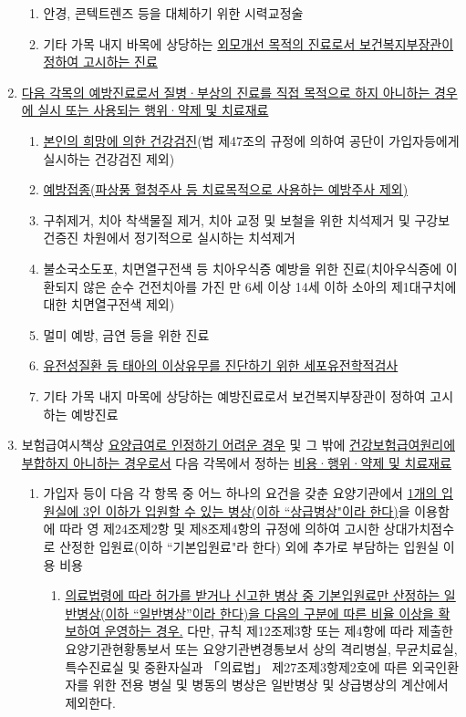 \begin{enumerate}[1.]
\begin{enumerate}[가.]
	\item 안경, 콘텍트렌즈 등을 대체하기 위한 시력교정술
	\item 기타 가목 내지 바목에 상당하는 \uline{외모개선 목적의 진료로서 보건복지부장관이 정하여 고시하는 진료}
	\end{enumerate}
\item \uline{다음 각목의 예방진료로서 질병·부상의 진료를 직접 목적으로 하지 아니하는 경우에 실시 또는 사용되는 행위·약제 및 치료재료}
	\begin{enumerate}[가.]\tightlist
	\item \uline{본인의 희망에 의한 건강검진}(법 제47조의 규정에 의하여 공단이 가입자등에게 실시하는 건강검진 제외)
	\item \uline{예방접종(파상풍 혈청주사 등 치료목적으로 사용하는 예방주사 제외)}
	\item 구취제거, 치아 착색물질 제거, 치아 교정 및 보철을 위한 치석제거 및 구강보건증진 차원에서 정기적으로 실시하는 치석제거
	\item 불소국소도포, 치면열구전색 등 치아우식증 예방을 위한 진료(치아우식증에 이환되지 않은 순수 건전치아를 가진 만 6세 이상 14세 이하 소아의 제1대구치에 대한 치면열구전색 제외)
	\item 멀미 예방, 금연 등을 위한 진료
	\item \uline{유전성질환 등 태아의 이상유무를 진단하기 위한 세포유전학적검사}
	\item 기타 가목 내지 마목에 상당하는 예방진료로서 보건복지부장관이 정하여 고시하는 예방진료
	\end{enumerate}
\item 보험급여시책상 \uline{요양급여로 인정하기 어려운 경우} 및 그 밖에 \uline{건강보험급여원리에 부합하지 아니하는 경우로서} 다음 각목에서 정하는 \uline{비용·행위·약제 및 치료재료}
	\begin{enumerate}[가.]\tightlist
	\item 가입자 등이 다음 각 항목 중 어느 하나의 요건을 갖춘 요양기관에서 \uline{1개의 입원실에 3인 이하가 입원할 수 있는 병상(이하 ``상급병상"이라 한다)}을 이용함에 따라 영 제24조제2항 및 제8조제4항의 규정에 의하여 고시한 상대가치점수로 산정한 입원료(이하 ``기본입원료"라 한다) 외에 추가로 부담하는 입원실 이용 비용
    		\begin{enumerate}[(1)]\tightlist
			\item \uline{의료법령에 따라 허가를 받거나 신고한 병상 중 기본입원료만 산정하는 일반병상(이하 “일반병상”이라 한다)을 다음의 구분에 따른 비율 이상을 확보하여 운영하는 경우.} 다만, 규칙 제12조제3항 또는 제4항에 따라 제출한 요양기관현황통보서 또는 요양기관변경통보서 상의 격리병실, 무균치료실, 특수진료실 및 중환자실과 「의료법」 제27조제3항제2호에 따른 외국인환자를 위한 전용 병실 및 병동의 병상은 일반병상 및 상급병상의 계산에서 제외한다.

\end{enumerate}
\end{enumerate}
\end{enumerate}
